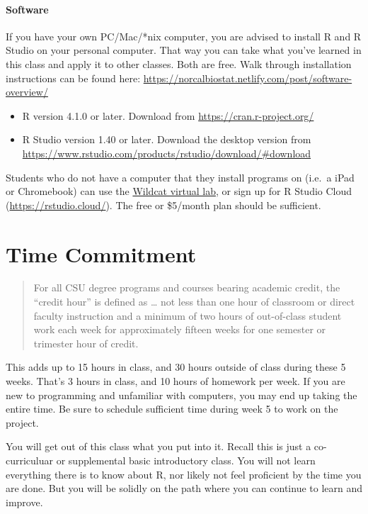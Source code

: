 \documentclass[
  11pt,
]{article}
\providecommand{\tightlist}{%
  \setlength{\itemsep}{0pt}\setlength{\parskip}{0pt}}
\begin{document}
\hypertarget{software}{%
\paragraph{Software}\label{software}}

If you have your own PC/Mac/*nix computer, you are advised to install R
and R Studio on your personal computer. That way you can take what
you've learned in this class and apply it to other classes. Both are
free. Walk through installation instructions can be found here:
\url{https://norcalbiostat.netlify.com/post/software-overview/}

\begin{itemize}
\tightlist
\item
  R version 4.1.0 or later. Download from
  \url{https://cran.r-project.org/}
\item
  R Studio version 1.40 or later. Download the desktop version from
  \url{https://www.rstudio.com/products/rstudio/download/\#download}
\end{itemize}

Students who do not have a computer that they install programs on
(i.e.~a iPad or Chromebook) can use the
\href{https://support.csuchico.edu/TDClient/1984/Portal/KB/ArticleDet?ID=112333}{Wildcat
virtual lab}, or sign up for R Studio Cloud
(\url{https://rstudio.cloud/}). The free or \$5/month plan should be
sufficient.

\hypertarget{time-commitment}{%
\section{Time Commitment}\label{time-commitment}}

\begin{quote}
For all CSU degree programs and courses bearing academic credit, the
``credit hour'' is defined as \ldots{} not less than one hour of
classroom or direct faculty instruction and a minimum of two hours of
out-of-class student work each week for approximately fifteen weeks for
one semester or trimester hour of credit.
\end{quote}

This adds up to 15 hours in class, and 30 hours outside of class during
these 5 weeks. That's 3 hours in class, and 10 hours of homework per
week. If you are new to programming and unfamiliar with computers, you
may end up taking the entire time. Be sure to schedule sufficient time
during week 5 to work on the project.

You will get out of this class what you put into it. Recall this is just
a co-curriculuar or supplemental basic introductory class. You will not
learn everything there is to know about R, nor likely not feel
proficient by the time you are done. But you will be solidly on the path
where you can continue to learn and improve.
\end{document}

